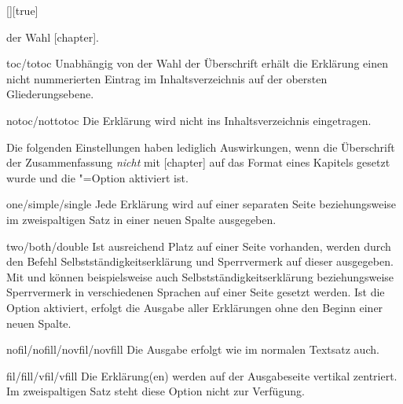\documentclass[%
  english,ngerman,%
  headings=optiontoheadandtoc,captions=tableheading,numbers=noenddot,%
  chapterpage,cdfoot,%
]{tudscrman}
\begin{document}
\begin{Declaration}{[\PSet]}[true]
\begin{values}
  der Wahl [chapter].
\item[toc/totoc]
  Unabhängig von der Wahl der Überschrift erhält die Erklärung einen nicht
  nummerierten Eintrag im Inhaltsverzeichnis auf der obersten Gliederungsebene. 
\item[notoc/nottotoc]
  Die Erklärung wird nicht ins Inhaltsverzeichnis eingetragen.
\end{values}
%
Die folgenden Einstellungen haben lediglich Auswirkungen, wenn die Überschrift 
der Zusammenfassung \emph{nicht} mit [chapter] auf das 
Format eines Kapitels gesetzt wurde und die "=Option aktiviert 
ist.
%
\begin{values}
\item[one/simple/single]Jede Erklärung wird auf einer separaten Seite
  beziehungsweise im zweispaltigen Satz in einer neuen Spalte ausgegeben.
\item[two/both/double]
  Ist ausreichend Platz auf einer Seite vorhanden, werden durch den Befehl 
   Selbstständigkeitserklärung und Sperrvermerk auf 
  dieser ausgegeben. Mit  und  können 
  beispielsweise auch Selbstständigkeitserklärung beziehungsweise Sperrvermerk 
  in verschiedenen Sprachen auf einer Seite gesetzt werden. Ist die Option 
   aktiviert, erfolgt die Ausgabe aller Erklärungen ohne den 
  Beginn einer neuen Spalte.
\item[nofil/nofill/novfil/novfill]
  Die Ausgabe erfolgt wie im normalen Textsatz auch.
\item[fil/fill/vfil/vfill]
  Die Erklärung(en) werden auf der Ausgabeseite vertikal zentriert. Im 
  zweispaltigen Satz steht diese Option nicht zur Verfügung.
\end{values}
\end{Declaration}
\end{document}
